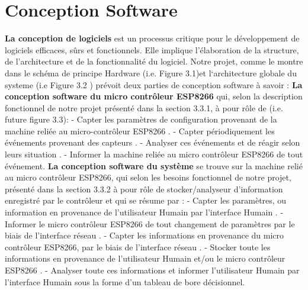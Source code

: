 \section{Conception Software}
\textbf{ La conception de logiciels}  est un processus critique pour le développement de logiciels efficaces, sûrs et fonctionnels. Elle implique l'élaboration de la structure, de l'architecture et de la fonctionnalité du logiciel.
Notre projet, comme  le montre dans le schéma de principe Hardware (i.e. Figure 3.1)et l`architecture globale du systeme (i.e Figure 3.2 ) \newline prévoit deux parties de conception software à savoir : 
\newline
\textbf{La conception software du micro contrôleur ESP8266} qui, selon la description fonctionnel de notre projet présenté dans la section 3.3.1, à pour rôle de (i.e.  future figure 3.3):
	\newline
   - Capter les paramètres de configuration provenant de la machine reliée au micro-contrôleur ESP8266 .
\newline
	- Capter périodiquement les événements provenant des capteurs .
\newline
	- Analyser ces événements et de réagir selon leurs situation .
	\newline
	- Informer la machine reliée au micro contrôleur ESP8266 de tout événement.
\newline
	\textbf{La conception software du système} se trouve sur la machine relié au micro contrôleur ESP8266, qui selon les besoins fonctionnel de notre projet, présenté dans la section 3.3.2 à pour rôle de stocker/analyseur d’information enregistré par le contrôleur et qui se résume par :
	\newline
	- Capter les paramètres, ou information en provenance de l’utilisateur Humain par l’interface Humain .
	\newline
	- Informer le micro contrôleur ESP8266 de tout changement de paramètres par le biais de l’interface réseau .
	\newline
	- Capter les informations en provenance du micro contrôleur ESP8266, par le biais de l’interface réseau .
	\newline
	- Stocker toute les informations en provenance de l’utilisateur Humain et/ou le micro contrôleur ESP8266 .
	\newline
	- Analyser toute ces informations et informer l’utilisateur Humain par l’interface Humain sous la forme d’un tableau de bore décisionnel. 
	
